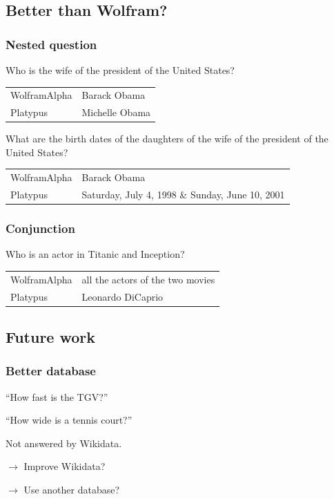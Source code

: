 \subsection{Better than Wolfram?}

\begin{frame}
    \frametitle{Nested question}

Who is the wife of the president of the United States?
    \begin{tabular}{ll}
        \alert{WolframAlpha} & Barack Obama\\
        \alert{Platypus} & Michelle Obama\\
    \end{tabular}

    \medbreak

    What are the birth dates of the daughters of the wife of the president of the United States?
    \begin{tabular}{ll}
        \alert{WolframAlpha} & Barack Obama\\
        \alert{Platypus} & Saturday, July 4, 1998 \& Sunday, June 10, 2001\\
    \end{tabular}
\end{frame}

\begin{frame}[fragile]
    \frametitle{Conjunction}

Who is an actor in Titanic and Inception?
    \begin{tabular}{ll}
        \alert{WolframAlpha} & all the actors of the two movies\\
        \alert{Platypus} & Leonardo DiCaprio\\
    \end{tabular}
\end{frame}

\subsection{Future work}

\begin{frame}
    \frametitle{Better database}

    ``How fast is the TGV?''

    ``How wide is a tennis court?''

    Not answered by \alert{Wikidata}.

    \medbreak

    $\rightarrow$ Improve Wikidata?

    $\rightarrow$ Use another database?
\end{frame}

